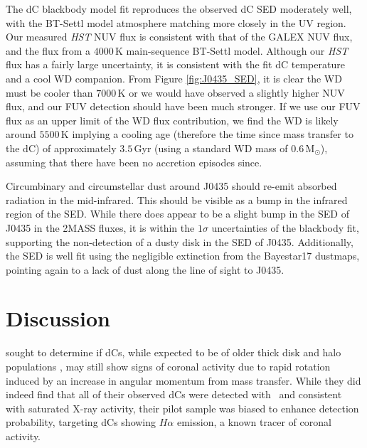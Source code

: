 \documentclass[twocolumn, tighten, times, astrosymb]{aastex631}
\begin{document}
The dC blackbody model fit reproduces the observed dC SED moderately well, with the BT-Settl model atmosphere matching more closely in the UV region. Our measured \textit{HST} NUV flux is consistent with that of the GALEX NUV flux, and the flux from a $4000$\,K main-sequence BT-Settl model. Although our \textit{HST} flux has a fairly large uncertainty, it is consistent with the fit dC temperature and a cool WD companion. From Figure \ref{fig:J0435_SED}, it is clear the WD must be cooler than $7000$\,K or we would have observed a slightly higher NUV flux, and our FUV detection should have been much stronger. If we use our FUV flux as an upper limit of the WD flux contribution, we find the WD is likely around $5500$\,K implying a cooling age (therefore the time since mass transfer to the dC) of approximately $3.5$\,Gyr (using a standard WD mass of $0.6$\,M$_\odot$), assuming that there have been no accretion episodes since.

Circumbinary and circumstellar dust around J0435 should re-emit absorbed radiation in the mid-infrared. This should be visible as a bump in the infrared region of the SED. While there does appear to be a slight bump in the SED of J0435 in the 2MASS fluxes, it is within the $1\sigma$ uncertainties of the blackbody fit, supporting the non-detection of a dusty disk in the SED of J0435. Additionally, the SED is well fit using the negligible extinction from the Bayestar17 dustmaps, pointing again to a lack of dust along the line of sight to J0435.

\section{Discussion}\label{sec:discussion}

\citet{Green2019} sought to determine if dCs, while expected to be of older thick disk and halo populations \citep{Green2013, Farihi2018}, may still show signs of coronal activity due to rapid rotation induced by an increase in angular momentum from mass transfer. While they did indeed find that all of their observed dCs were detected with \Chandra\ and consistent with saturated X-ray activity, their pilot sample was biased to enhance detection probability, targeting dCs showing $H\alpha$ emission, a known tracer of coronal activity. 
\end{document}

